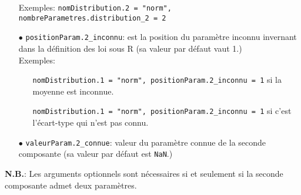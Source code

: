 \documentclass{article}
\newenvironment{fonction}[1][htb]
  {\renewcommand{\algorithmcfname}{Fonction}%
   \begin{algorithm}[#1]%
  }{\end{algorithm}}
\begin{document}
\begin{fonction}
\begin{itemize}
                \vspace*{0.2cm}
                Exemples: \texttt{nomDistribution.2 = "norm", nombreParametres.distribution\_2 = 2}
                \vspace*{0.2cm}
                \item[$\bullet$] \texttt{positionParam.2\_inconnu}: est la position du paramètre inconnu invernant dans la définition des loi sous R (sa valeur par défaut vaut 1.) \\
                \vspace*{0.2cm}
                Exemples: 
                    \begin{itemize}
                        \item[] \texttt{nomDistribution.1 = "norm", positionParam.2\_inconnu = 1} si la moyenne est inconnue. 
                        \item[] \texttt{nomDistribution.1 = "norm", positionParam.2\_inconnu = 1} si c'est l'écart-type qui n'est pas connu. 
                    \end{itemize}
                \vspace*{0.2cm}
                \item[$\bullet$] \texttt{valeurParam.2\_connue}: valeur du paramètre connue de la seconde composante (sa valeur par défaut est \texttt{NaN}.)
            \end{itemize}
    \end{fonction}
    \textbf{N.B.}: Les arguments optionnels sont nécessaires si et seulement si la seconde composante admet deux paramètres.
\end{document}

